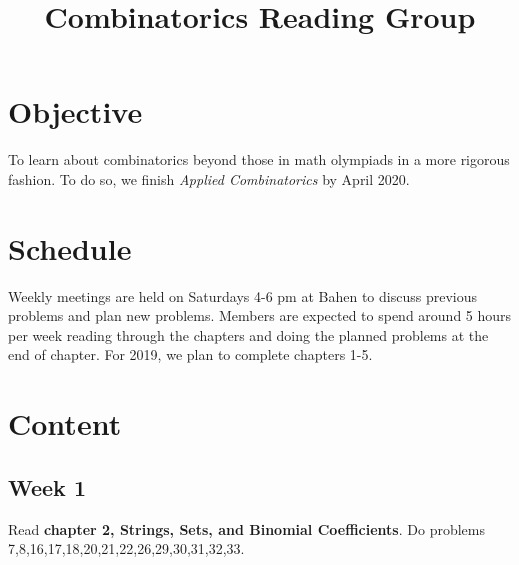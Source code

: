 \documentclass[12pt]{article}
\begin{document}
	
	
\title{Combinatorics Reading Group}
\maketitle
	
\section{Objective}
To learn about combinatorics beyond those in math olympiads in a more rigorous fashion. To do so, we finish \textit{Applied Combinatorics} by April 2020.

\section{Schedule}
Weekly meetings are held on Saturdays 4-6 pm at Bahen to discuss previous problems and plan new problems. Members are expected to spend around 5 hours per week reading through the chapters and doing the planned problems at the end of chapter. For 2019, we plan to complete chapters 1-5.

\section{Content}
	\subsection{Week 1}
	Read \textbf{chapter 2, Strings, Sets, and Binomial Coefficients}. Do problems 7,8,16,17,18,20,21,22,26,29,30,31,32,33.
\end{document}
